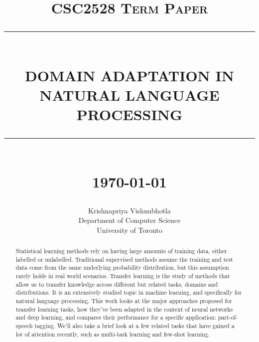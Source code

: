 \documentclass[12pt]{report}
\newcommand{\HRule}[1]{\rule{\linewidth}{#1}}
\begin{document}
	
	\title{ \normalsize \textsc{CSC2528 Term Paper}
		\\ [2.0cm]
		\HRule{0.5pt} \\
		\LARGE \textbf{\uppercase{Domain Adaptation in Natural Language Processing}}
		\HRule{2pt} \\ [0.5cm]
		\normalsize \today \vspace*{5\baselineskip}}
	
	\date{}
	
	\author{
		Krishnapriya Vishnubhotla \\ 
		Department of Computer Science \\
		University of Toronto 
		 }
	
	\maketitle
	\tableofcontents
	\newpage
	
	\begin{abstract}
		
		Statistical learning methods rely on having large amounts of training data, either labelled or unlabelled. Traditional supervised methods assume the training and test data come from the same underlying probability distribution, but this assumption rarely holds in real world scenarios. Transfer learning is the study of methods that allow us to transfer knowledge across different but related tasks, domains and distributions. It is an extensively studied topic in machine learning, and specifically for natural language processing. This work looks at the major approaches proposed for transfer learning tasks, how they've been adapted in the context of neural networks and deep learning, and compares their performance for a specific application: part-of-speech tagging. We'll also take a brief look at a few related tasks that have gained a lot of attention recently, such as multi-task learning and few-shot learning. 
		
	\end{abstract}

	
\end{document}
